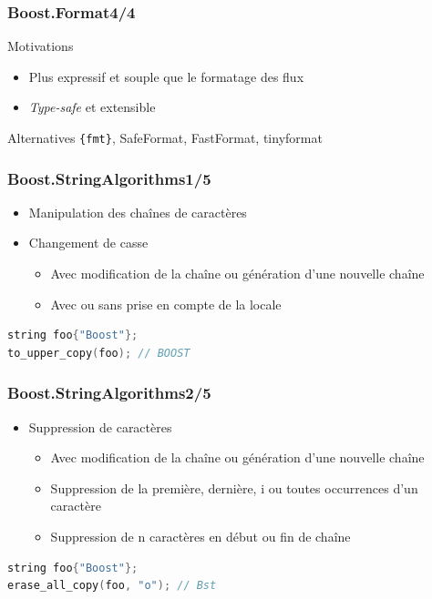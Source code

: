 \documentclass[C++.tex]{subfiles}
\begin{document}
\begin{frame}[fragile]
	\frametitle{Boost.Format\titlehfill{}4/4}
	\begin{block}{Motivations}
		\begin{itemize}
			\item Plus expressif et souple que le formatage des flux
			\item \textit{Type-safe} et extensible
		\end{itemize}
	\end{block}

	\begin{block}{Alternatives}
		\lstinline|{fmt}|, SafeFormat, FastFormat,  tinyformat

	\end{block}
\end{frame}

\begin{frame}[fragile]
	\frametitle{Boost.StringAlgorithms\titlehfill{}1/5}
	\begin{itemize}
		\item Manipulation des chaînes de caractères
		\item Changement de casse
		\begin{itemize}
			\item Avec modification de la chaîne ou génération d'une nouvelle chaîne
			\item Avec ou sans prise en compte de la locale
		\end{itemize}
	\end{itemize}

	\begin{lstlisting}[language=C++]
string foo{"Boost"};
to_upper_copy(foo); // BOOST\end{lstlisting}
\end{frame}

\begin{frame}[fragile]
	\frametitle{Boost.StringAlgorithms\titlehfill{}2/5}
	\begin{itemize}
		\item Suppression de caractères
		\begin{itemize}
			\item Avec modification de la chaîne ou génération d'une nouvelle chaîne
			\item Suppression de la première, dernière, i\ieme{} ou toutes occurrences d'un caractère
			\item Suppression de n caractères en début ou fin de chaîne
		\end{itemize}
	\end{itemize}

	\begin{lstlisting}[language=C++]
string foo{"Boost"};
erase_all_copy(foo, "o"); // Bst\end{lstlisting}
\end{frame}
\end{document}

